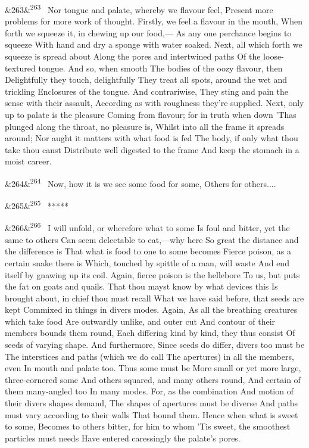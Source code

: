 \documentclass[12pt]{article}
\newcommand{\para}[1][]{\par\noindent\ifx&#1&\else\textsuperscript{\footnotesize #1}~\fi}
\begin{document}
\para[263] Nor tongue and palate, whereby we flavour feel, Present more problems for more work of thought. Firstly, we feel a flavour in the mouth, When forth we squeeze it, in chewing up our food,--- As any one perchance begins to squeeze With hand and dry a sponge with water soaked. Next, all which forth we squeeze is spread about Along the pores and intertwined paths Of the loose-textured tongue. And so, when smooth The bodies of the oozy flavour, then Delightfully they touch, delightfully They treat all spots, around the wet and trickling Enclosures of the tongue. And contrariwise, They sting and pain the sense with their assault, According as with roughness they're supplied. Next, only up to palate is the pleasure Coming from flavour; for in truth when down 'Thas plunged along the throat, no pleasure is, Whilst into all the frame it spreads around; Nor aught it matters with what food is fed The body, if only what thou take thou canst Distribute well digested to the frame And keep the stomach in a moist career.

\para[264] Now, how it is we see some food for some, Others for others....

\para[265] *****

\para[266] I will unfold, or wherefore what to some Is foul and bitter, yet the same to others Can seem delectable to eat,---why here So great the distance and the difference is That what is food to one to some becomes Fierce poison, as a certain snake there is Which, touched by spittle of a man, will waste And end itself by gnawing up its coil. Again, fierce poison is the hellebore To us, but puts the fat on goats and quails. That thou mayst know by what devices this Is brought about, in chief thou must recall What we have said before, that seeds are kept Commixed in things in divers modes. Again, As all the breathing creatures which take food Are outwardly unlike, and outer cut And contour of their members bounds them round, Each differing kind by kind, they thus consist Of seeds of varying shape. And furthermore, Since seeds do differ, divers too must be The interstices and paths (which we do call The apertures) in all the members, even In mouth and palate too. Thus some must be More small or yet more large, three-cornered some And others squared, and many others round, And certain of them many-angled too In many modes. For, as the combination And motion of their divers shapes demand, The shapes of apertures must be diverse And paths must vary according to their walls That bound them. Hence when what is sweet to some, Becomes to others bitter, for him to whom 'Tis sweet, the smoothest particles must needs Have entered caressingly the palate's pores.
\end{document}
